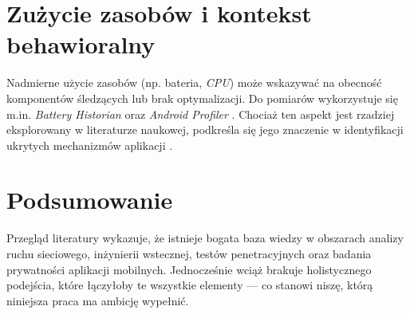 \section{Zużycie zasobów i kontekst behawioralny}
Nadmierne użycie zasobów (np. bateria, \emph{CPU}) może wskazywać na obecność komponentów śledzących lub brak optymalizacji. Do pomiarów wykorzystuje się m.in. \textit{Battery Historian} oraz \textit{Android Profiler} \cite{BatteryHistorian,AndroidProfiler}. Chociaż ten aspekt jest rzadziej eksplorowany w literaturze naukowej, podkreśla się jego znaczenie w identyfikacji ukrytych mechanizmów aplikacji \cite{Pathak2012BatteryDrain}.

\section{Podsumowanie}
Przegląd literatury wykazuje, że istnieje bogata baza wiedzy w obszarach analizy ruchu sieciowego, inżynierii wstecznej, testów penetracyjnych oraz badania prywatności aplikacji mobilnych. Jednocześnie wciąż brakuje holistycznego podejścia, które łączyłoby te wszystkie elementy — co stanowi niszę, którą niniejsza praca ma ambicję wypełnić.
